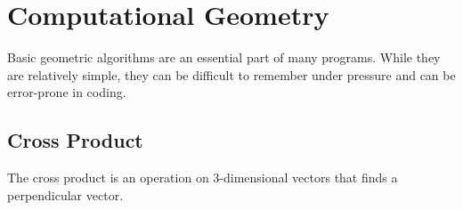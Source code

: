 \section{Computational Geometry}
Basic geometric algorithms are an essential part of many programs. While they are relatively simple, they can be difficult to remember under pressure and can be error-prone in coding. 

\subsection{Cross Product}
The cross product is an operation on 3-dimensional vectors that finds a perpendicular vector.




